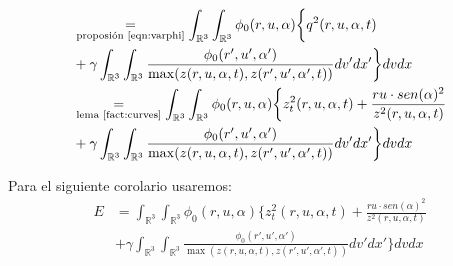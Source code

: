 \documentclass[a4paper,10pt]{scrartcl}
\theoremstyle{definition}
\numberwithin{equation}{section}
\begin{document}
\begin{align*}
 &\underset{\textrm{proposión \ref{eqn:varphi}}}{=} \int_{\mathbb{R}^3}\int_{\mathbb{R}^3} \phi_0(r,u,\alpha) \bigg\{q^2(r,u,\alpha,t)\\
 &+ \gamma\int_{\mathbb{R}^3} \int_{\mathbb{R}^3} \frac{\phi_0(r',u',\alpha')}{\max(z(r,u,\alpha,t), z(r',u',\alpha',t))} dv' dx' \bigg\}dv dx \\
 &\underset{\textrm{lema \ref{fact:curves}}}{=} \int_{\mathbb{R}^3}\int_{\mathbb{R}^3} \phi_0(r,u,\alpha) \bigg\{z_t^2(r,u,\alpha,t) + \frac{ru\cdot sen(\alpha)^2}{z^2(r,u,\alpha,t)} \\
 &+ \gamma\int_{\mathbb{R}^3} \int_{\mathbb{R}^3} \frac{\phi_0(r',u',\alpha')}{\max(z(r,u,\alpha,t), z(r',u',\alpha',t))} dv' dx' \bigg\}dv dx 
\end{align*}

Para el siguiente corolario usaremos:
\begin{align*}
 E &= \int_{\mathbb{R}^3}\int_{\mathbb{R}^3} \phi_0(r,u,\alpha) \bigg\{z_t^2(r,u,\alpha,t) + \frac{ru\cdot sen(\alpha)^2}{z^2(r,u,\alpha,t)}\\
 &+ \gamma\int_{\mathbb{R}^3} \int_{\mathbb{R}^3} \frac{\phi_0(r',u',\alpha')}{\max(z(r,u,\alpha,t), z(r',u',\alpha',t))} dv' dx' \bigg\}dv dx 
\end{align*}
\end{document}
